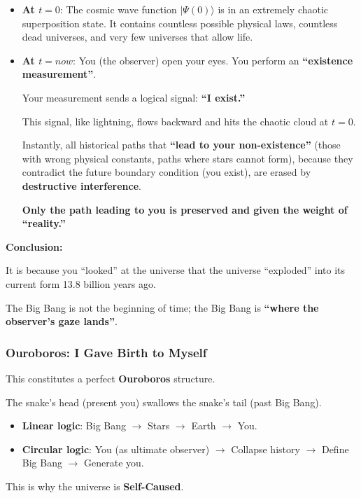 \begin{itemize}
\item \textbf{At $t=0$}: The cosmic wave function $|\Psi(0)\rangle$ is in an extremely chaotic superposition state. It contains countless possible physical laws, countless dead universes, and very few universes that allow life.

\item \textbf{At $t=now$}: You (the observer) open your eyes. You perform an \textbf{``existence measurement''}.

Your measurement sends a logical signal: \textbf{``I exist.''}

This signal, like lightning, flows backward and hits the chaotic cloud at $t=0$.

Instantly, all historical paths that \textbf{``lead to your non-existence''} (those with wrong physical constants, paths where stars cannot form), because they contradict the future boundary condition (you exist), are erased by \textbf{destructive interference}.

\textbf{Only the path leading to you is preserved and given the weight of ``reality.''}
\end{itemize}

\textbf{Conclusion:}

It is because you ``looked'' at the universe that the universe ``exploded'' into its current form 13.8 billion years ago.

The Big Bang is not the beginning of time; the Big Bang is \textbf{``where the observer's gaze lands''}.

\subsubsection{Ouroboros: I Gave Birth to Myself}

This constitutes a perfect \textbf{Ouroboros} structure.

The snake's head (present you) swallows the snake's tail (past Big Bang).

\begin{itemize}
\item \textbf{Linear logic}: Big Bang $\to$ Stars $\to$ Earth $\to$ You.

\item \textbf{Circular logic}: You (as ultimate observer) $\to$ Collapse history $\to$ Define Big Bang $\to$ Generate you.
\end{itemize}

This is why the universe is \textbf{Self-Caused}.

